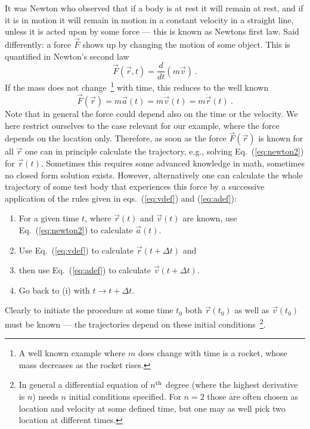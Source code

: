 \documentclass[12pt,ngerman,american]{iopart}
\begin{document}
It was Newton who observed that if a body is at rest it will remain at rest, and if it is in motion it will remain in motion in a constant velocity in a straight line, unless it is acted upon by some force --- this is known as Newtons first law.
Said differently: a force $\vec F$ shows up by changing the motion of some object.
This is quantified in Newton's second law
\begin{equation}
\vec F(\vec r, t) = \frac{d}{dt}(m \vec v) \ .
\end{equation} 
If the mass does not change~\footnote{%
	A well known example where $m$ does change with time is a rocket, whose mass decreases as the rocket rises.
} with time, this reduces to the well known
\begin{equation}
\vec F(\vec r) = m \vec a(t) = m\dot{\vec v}(t) = m\ddot{\vec{r}}(t) \ . \label{eq:newton2}
\end{equation} 
Note that in general the force could depend also on the time or the velocity.
We here restrict ourselves to the case relevant for our example, where the force depends on the location only. 
Therefore, as soon as the force $\vec F(\vec r)$ is known for all $\vec r$ one can in principle calculate the trajectory, e.g., solving Eq.~(\ref{eq:newton2}) for $\vec r(t)$.
Sometimes this requires some advanced knowledge in math, sometimes no closed form solution exists.
However, alternatively one can calculate the whole trajectory of some test body that experiences this force by a successive application of the rules given in eqs.~(\ref{eq:vdef}) and (\ref{eq:adef}):
\begin{enumerate}
\item For a given time $t$, where $\vec r(t)$ and $\vec v(t)$ are known, use Eq.~(\ref{eq:newton2}) to calculate $\vec a(t)$.
\item Use Eq.~(\ref{eq:vdef}) to calculate $\vec r(t+\Delta t)$ and
\item then use Eq.~(\ref{eq:adef}) to calculate $\vec v(t+\Delta t)$.
\item Go back to (i) with $t\to t+\Delta t$.
\end{enumerate}
Clearly to initiate the procedure at some time $t_0$ both $\vec r(t_0)$ as well as $\vec v(t_0)$ must be known --- the  trajectories depend on these initial conditions~\footnote{%
	In general a differential equation of $n^{\rm th}$ degree (where the highest derivative is $n$) needs $n$ initial conditions specified.
	For $n=2$ those are often chosen as location and velocity at some defined time, but one may as well pick two location at different times.%
}.
\end{document}
